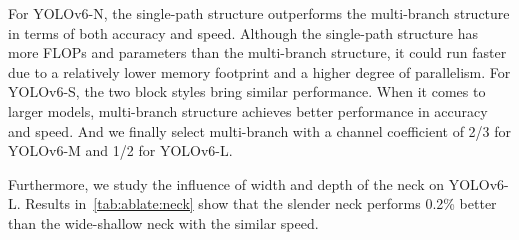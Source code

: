 \documentclass[10pt,twocolumn,letterpaper]{article}
\begin{document}
  For YOLOv6-N, the single-path structure outperforms the multi-branch structure in terms of both accuracy and speed. Although the single-path structure has more FLOPs and parameters than the multi-branch structure, it could run faster due to a relatively lower memory footprint and a higher degree of parallelism. For YOLOv6-S, the two block styles bring similar performance. When it comes to larger models, multi-branch structure achieves better performance in accuracy and speed. And we finally select multi-branch with a channel coefficient of 2/3 for YOLOv6-M and 1/2 for YOLOv6-L. 

  Furthermore, we study the influence of width and depth of the neck on YOLOv6-L. Results in~\cref{tab:ablate:neck} show that the slender neck performs 0.2\% better than the wide-shallow neck with the similar speed.

  
  \begin{table}
      \centering
    \caption{Ablation study on backbones and necks. YOLOv6-L here is equipped with  ReLU.}
    \label{tab:ablate:network}
\end{table}
\end{document}
